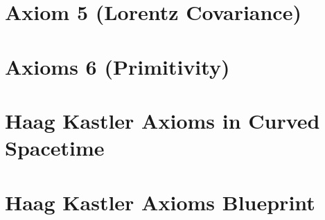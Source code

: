 \chapter{Axiom 5 (Lorentz Covariance)}\label{chptr:axiom-5-(lorentz-covariance)}




\chapter{Axioms 6 (Primitivity)}\label{chptr:axiom-6-(primitivity)}




\chapter{Haag Kastler Axioms in Curved Spacetime}\label{chptr:haag-kastler-axioms-in-curved-spacetime}








\chapter{Haag Kastler Axioms Blueprint}\label{chptr:haag-kastler-axioms-blueprint}












